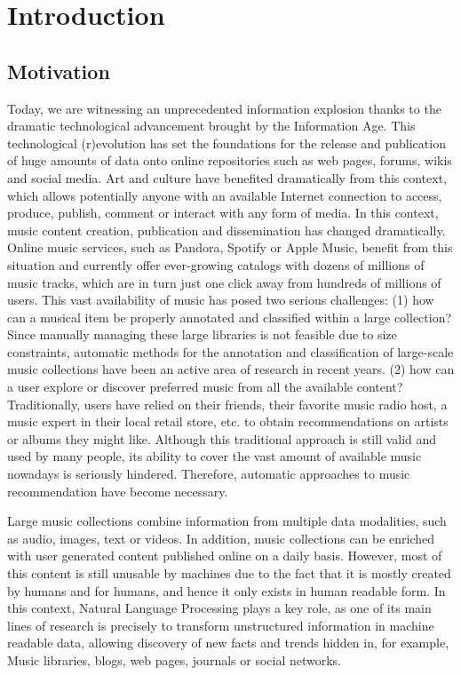
\chapter{Introduction}
\label{sec:intro}

\section{Motivation}
\label{sec:intro:motivation}

Today, we are witnessing an unprecedented information explosion thanks to the dramatic technological advancement brought by the Information Age. This technological (r)evolution has set the foundations for the release and publication of huge amounts of data onto online repositories such as web pages, forums, wikis and social media. Art and culture have benefited dramatically from this context, which allows potentially anyone with an available Internet connection to access, produce, publish, comment or interact with any form of media. 
In this context, music content creation, publication and dissemination has changed dramatically. 
Online music services, such as Pandora, Spotify or Apple Music, benefit from this situation and currently offer ever-growing catalogs with dozens of millions of music tracks, which are in turn just one click away from hundreds of millions of users. This vast availability of music has posed two serious challenges: (1) how can a musical item be properly annotated and classified within a large collection? Since manually managing these large libraries is not feasible due to size constraints, automatic methods for the annotation and classification of large-scale music collections have been an active area of research in recent years. (2) how can a user explore or discover preferred music from all the available content? Traditionally, users have relied on their friends, their favorite music radio host, a music expert in their local retail store, etc. to obtain recommendations on artists or albums they might like. Although this traditional approach is still valid and used by many people, its ability to cover the vast amount of available music nowadays is seriously hindered. Therefore, automatic approaches to music recommendation have become necessary.

Large music collections combine information from multiple data modalities, such as audio, images, text or videos. In addition, music collections can be enriched with user generated content published online on a daily basis. However, most of this content is still unusable by machines due to the fact that it is mostly created by humans and for humans, and hence it only exists in human readable form. In this context, Natural Language Processing plays a key role, as one of its main lines of research is precisely to transform unstructured information in machine readable data, allowing discovery of new facts and trends hidden in, for example, Music libraries, blogs, web pages, journals or social networks.

